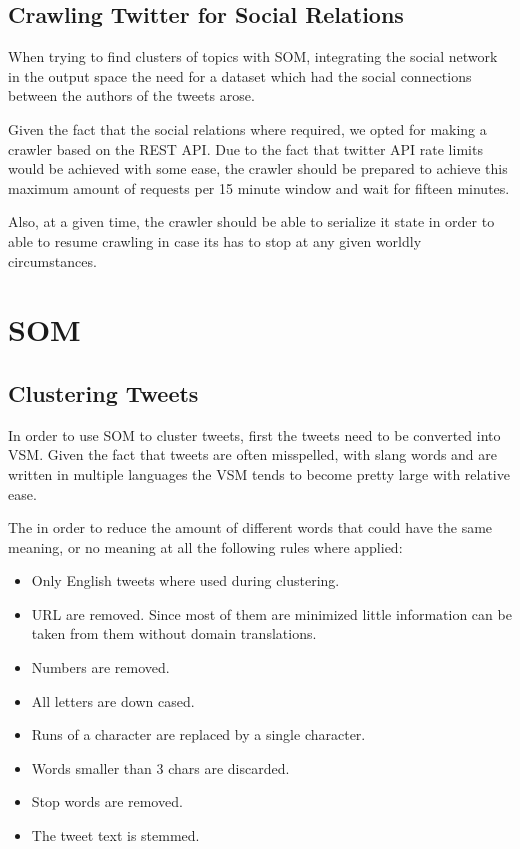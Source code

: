 \subsection{Crawling Twitter for Social Relations}
\label{sub:crawling_twitter_for_social_relations}
When trying to find clusters of topics with \ac{SOM}, integrating the social network in the output space the need for a dataset which had the social connections between the authors of the tweets arose.

Given the fact that the social relations where required, we opted for making a crawler based on the REST API. Due to the fact that twitter API rate limits would be achieved with some ease, the crawler should be prepared to achieve this maximum amount of requests per 15 minute window and wait for fifteen minutes. 

Also, at a given time, the crawler should be able to serialize it state in order to able to resume crawling in case its has to stop at any given worldly circumstances. 

\section{SOM}

\subsection{Clustering Tweets}
\label{sub:clustering_tweets}

In order to use \ac{SOM} to cluster tweets, first the tweets need to be converted into \ac{VSM}. Given the fact that tweets are often misspelled, with slang words and are written in multiple languages the \ac{VSM} tends to become pretty large with relative ease. 

The in order to reduce the amount of different words that could have the same meaning, or no meaning at all the following rules where applied:

\begin{itemize}
  \item Only English tweets where used during clustering.
  \item \ac{URL} are removed. Since most of them are minimized little information can be taken from them without domain translations.
  \item Numbers are removed.
  \item All letters are down cased.
  \item Runs of a character are replaced by a single character.
  \item Words smaller than 3 chars are discarded.
  \item Stop words are removed. 
  \item The tweet text is stemmed.
\end{itemize}


